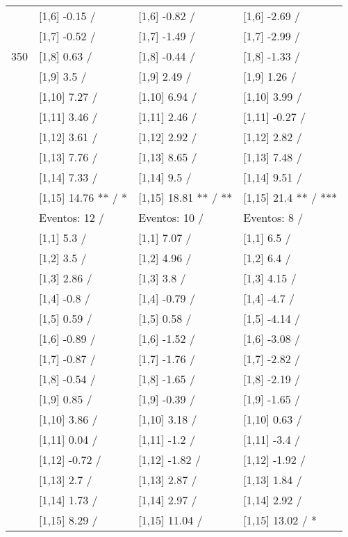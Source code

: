 \begin{table}
\begin{tabular}[t]{llll}
 & {}[1,6] -0.15  / & {}[1,6] -0.82  / & {}[1,6] -2.69  /\\
 & {}[1,7] -0.52  / & {}[1,7] -1.49  / & {}[1,7] -2.99  /\\
350 & {}[1,8] 0.63  / & {}[1,8] -0.44  / & {}[1,8] -1.33  /\\
\addlinespace
 & {}[1,9] 3.5  / & {}[1,9] 2.49  / & {}[1,9] 1.26  /\\
 & {}[1,10] 7.27  / & {}[1,10] 6.94  / & {}[1,10] 3.99  /\\
 & {}[1,11] 3.46  / & {}[1,11] 2.46  / & {}[1,11] -0.27  /\\
 & {}[1,12] 3.61  / & {}[1,12] 2.92  / & {}[1,12] 2.82  /\\
 & {}[1,13] 7.76  / & {}[1,13] 8.65  / & {}[1,13] 7.48  /\\
\addlinespace
 & {}[1,14] 7.33  / & {}[1,14] 9.5  / & {}[1,14] 9.51  /\\
 & {}[1,15] 14.76 ** / * & {}[1,15] 18.81 ** / ** & {}[1,15] 21.4 ** / ***\\
 & Eventos:  12 / & Eventos:  10 / & Eventos:  8 /\\
 & {}[1,1] 5.3  / & {}[1,1] 7.07  / & {}[1,1] 6.5  /\\
 & {}[1,2] 3.5  / & {}[1,2] 4.96  / & {}[1,2] 6.4  /\\
\addlinespace
 & {}[1,3] 2.86  / & {}[1,3] 3.8  / & {}[1,3] 4.15  /\\
 & {}[1,4] -0.8  / & {}[1,4] -0.79  / & {}[1,4] -4.7  /\\
 & {}[1,5] 0.59  / & {}[1,5] 0.58  / & {}[1,5] -4.14  /\\
 & {}[1,6] -0.89  / & {}[1,6] -1.52  / & {}[1,6] -3.08  /\\
 & {}[1,7] -0.87  / & {}[1,7] -1.76  / & {}[1,7] -2.82  /\\
\addlinespace
500 & {}[1,8] -0.54  / & {}[1,8] -1.65  / & {}[1,8] -2.19  /\\
 & {}[1,9] 0.85  / & {}[1,9] -0.39  / & {}[1,9] -1.65  /\\
 & {}[1,10] 3.86  / & {}[1,10] 3.18  / & {}[1,10] 0.63  /\\
 & {}[1,11] 0.04  / & {}[1,11] -1.2  / & {}[1,11] -3.4  /\\
 & {}[1,12] -0.72  / & {}[1,12] -1.82  / & {}[1,12] -1.92  /\\
\addlinespace
 & {}[1,13] 2.7  / & {}[1,13] 2.87  / & {}[1,13] 1.84  /\\
 & {}[1,14] 1.73  / & {}[1,14] 2.97  / & {}[1,14] 2.92  /\\
 & {}[1,15] 8.29  / & {}[1,15] 11.04  / & {}[1,15] 13.02  / *\\
\bottomrule
\end{tabular}
\end{table}
